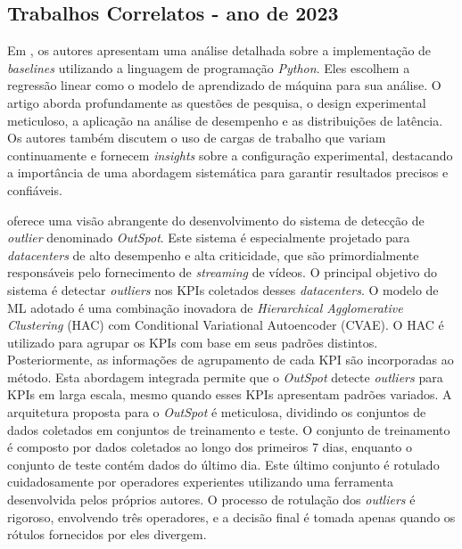 \subsection{Trabalhos Correlatos - ano de 2023}\label{trab_correlatos_23}

Em \cite{10098585}, os autores apresentam uma análise detalhada sobre a implementação de \textit{baselines} utilizando a linguagem de programação \textit{Python}. Eles escolhem a regressão linear como o modelo de aprendizado de máquina para sua análise. O artigo aborda profundamente as questões de pesquisa, o design experimental meticuloso, a aplicação na análise de desempenho e as distribuições de latência. Os autores também discutem o uso de cargas de trabalho que variam continuamente e fornecem \textit{insights} sobre a configuração experimental, destacando a importância de uma abordagem sistemática para garantir resultados precisos e confiáveis.

\cite{10113794} oferece uma visão abrangente do desenvolvimento do sistema de detecção de \textit{outlier} denominado \textit{OutSpot}. Este sistema é especialmente projetado para \textit{datacenters} de alto desempenho e alta criticidade, que são primordialmente responsáveis pelo fornecimento de \textit{streaming} de vídeos. O principal objetivo do sistema é detectar \textit{outliers} nos KPIs coletados desses \textit{datacenters}. O modelo de ML adotado é uma combinação inovadora de \textit{Hierarchical Agglomerative Clustering} (HAC) com Conditional Variational Autoencoder (CVAE). O HAC é utilizado para agrupar os KPIs com base em seus padrões distintos. Posteriormente, as informações de agrupamento de cada KPI são incorporadas ao método. Esta abordagem integrada permite que o \textit{OutSpot} detecte \textit{outliers} para KPIs em larga escala, mesmo quando esses KPIs apresentam padrões variados. A arquitetura proposta para o \textit{OutSpot} é meticulosa, dividindo os conjuntos de dados coletados em conjuntos de treinamento e teste. O conjunto de treinamento é composto por dados coletados ao longo dos primeiros 7 dias, enquanto o conjunto de teste contém dados do último dia. Este último conjunto é rotulado cuidadosamente por operadores experientes utilizando uma ferramenta desenvolvida pelos próprios autores. O processo de rotulação dos \textit{outliers} é rigoroso, envolvendo três operadores, e a decisão final é tomada apenas quando os rótulos fornecidos por eles divergem.



